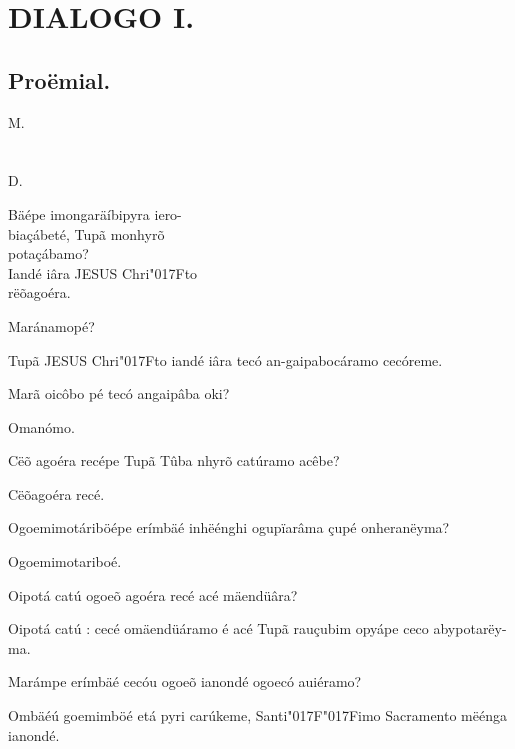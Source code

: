 \documentclass[openany,titlepage,12pt]{book}
\renewcommand{\chaptermark}[1]{\markboth{#1}{}}
\renewcommand{\sectionmark}[1]{\gdef\rightmark{#1}}
\newcommand{\lgS}{\char"017F}
\newcommand{\lgSS}{\char"017F\char"017F}
\begin{document}
\section{DIALOGO I.}
\unskip\vspace{-3pt}
\subsection{Proëmial.}
\chaptermark{Dialogo I.}
\sectionmark{Da Oraçãõ de Horto.}

\begin{minipage}[t]{0.03\linewidth}
    M.\\ \\ \\D.\\ 
\end{minipage}
\begin{minipage}[t]{1.08\linewidth}
    \lettrine
    [findent =-2pt, nindent=0pt, loversize=-0.2, lraise=0.05, lines=5]
    {}{B}äépe imongaräíbipyra iero-\\
    \hspace*{2ex}biaçábeté, Tupã monhyrõ\\
    \hspace*{2ex}potaçábamo?\\
    Iandé iâra JESUS Chri\lgS to\\
    \hspace*{2ex}rëõagoéra.
\end{minipage}
\begin{alternate}
    \item Maránamopé?
    \item Tupã JESUS Chri\lgS to iandé iâra 
    tecó an-gaipabocáramo cecóreme.
    \item Marã oicôbo pé tecó angaipâba oki?
    \item Omanómo.
    \item Cëõ agoéra recépe Tupã Tûba nhyrõ
    catúramo acêbe?
    \item Cëõagoéra recé.
    \item Ogoemimotáriböépe erímbäé inhëénghi
    ogupïarâma çupé onheranëyma?
    \item Ogoemimotariboé.
    \item Oipotá catú ogoeõ agoéra recé acé\linebreak
    mäendüâra?
    \item Oipotá catú : cecé omäendüáramo é acé
    Tupã rauçubim opyápe ceco abypotarëy-ma.
    \item Marámpe erímbäé cecóu ogoeõ ianondé
    ogoecó auiéramo?
    \item Ombäéú goemimböé etá pyri carúkeme,
    Santi\lgSS imo Sacramento mëénga ianondé.

\end{alternate}
\end{document}
